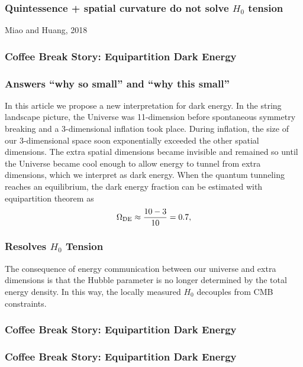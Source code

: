 \documentclass[CJK]{beamer}
\begin{document}
\begin{frame}
  \frametitle{Quintessence + spatial curvature do not solve $H_0$ tension}
  \begin{Large}
     

    Miao and Huang, 2018
  \end{Large}
\end{frame}


\begin{frame}
  \frametitle{Coffee Break Story: Equipartition Dark Energy}
\end{frame}

\begin{frame}
  \frametitle{Answers ``why so small'' and ``why this small''}

In this article we propose a new interpretation for dark energy. In the string landscape picture, the Universe was 11-dimension before spontaneous symmetry breaking and a 3-dimensional inflation took place. During inflation, the size of our 3-dimensional space soon exponentially exceeded the other spatial dimensions. The extra spatial dimensions became invisible and remained so until the Universe became cool enough to allow energy to tunnel from extra dimensions, which we interpret as dark energy. When the quantum tunneling reaches an equilibrium, the dark energy fraction can be estimated with equipartition theorem as
\begin{equation}
  \Omega_{\rm DE} \approx \frac{10-3}{10} = 0.7, \label{eq:eq}
\end{equation}
\end{frame}


\begin{frame}
  \frametitle{Resolves $H_0$ Tension}
  

  The consequence of energy communication between our universe and extra dimensions is that the Hubble parameter is no longer determined by the total energy density. In this way, the locally measured $H_0$ decouples from CMB constraints.

\end{frame}


\begin{frame}
  \frametitle{Coffee Break Story: Equipartition Dark Energy}
 
\end{frame}


\begin{frame}
  \frametitle{Coffee Break Story: Equipartition Dark Energy}
\end{frame}
\end{document}
